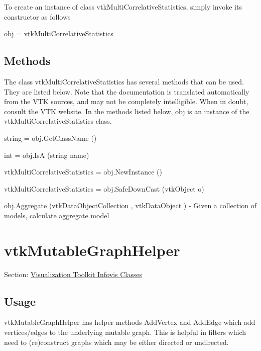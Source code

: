 To create an instance of class vtk\-Multi\-Correlative\-Statistics, simply invoke its constructor as follows \begin{DoxyVerb}  obj = vtkMultiCorrelativeStatistics
\end{DoxyVerb}
 \hypertarget{vtkwidgets_vtkxyplotwidget_Methods}{}\subsection{Methods}\label{vtkwidgets_vtkxyplotwidget_Methods}
The class vtk\-Multi\-Correlative\-Statistics has several methods that can be used. They are listed below. Note that the documentation is translated automatically from the V\-T\-K sources, and may not be completely intelligible. When in doubt, consult the V\-T\-K website. In the methods listed below, {\ttfamily obj} is an instance of the vtk\-Multi\-Correlative\-Statistics class. 
\begin{DoxyItemize}
\item {\ttfamily string = obj.\-Get\-Class\-Name ()}  
\item {\ttfamily int = obj.\-Is\-A (string name)}  
\item {\ttfamily vtk\-Multi\-Correlative\-Statistics = obj.\-New\-Instance ()}  
\item {\ttfamily vtk\-Multi\-Correlative\-Statistics = obj.\-Safe\-Down\-Cast (vtk\-Object o)}  
\item {\ttfamily obj.\-Aggregate (vtk\-Data\-Object\-Collection , vtk\-Data\-Object )} -\/ Given a collection of models, calculate aggregate model  
\end{DoxyItemize}\hypertarget{vtkinfovis_vtkmutablegraphhelper}{}\section{vtk\-Mutable\-Graph\-Helper}\label{vtkinfovis_vtkmutablegraphhelper}
Section\-: \hyperlink{sec_vtkinfovis}{Visualization Toolkit Infovis Classes} \hypertarget{vtkwidgets_vtkxyplotwidget_Usage}{}\subsection{Usage}\label{vtkwidgets_vtkxyplotwidget_Usage}
vtk\-Mutable\-Graph\-Helper has helper methods Add\-Vertex and Add\-Edge which add vertices/edges to the underlying mutable graph. This is helpful in filters which need to (re)construct graphs which may be either directed or undirected.

